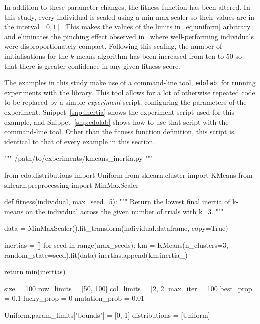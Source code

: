 In addition to these parameter changes, the fitness function has been altered.
In this study, every individual is scaled using a min-max scaler so their values
are in the interval \(\left[0, 1\right]\). This makes the values of the limits
in~\eqref{eq:uniform} arbitrary and eliminates the pinching effect observed
in~\cite{Wilde2020:edo} where well-performing individuals were
disproportionately compact. Following this scaling, the number of
initialisations for the \(k\)-means algorithm has been increased from ten to 50
so that there is greater confidence in any given fitness score.

The examples in this study make use of a command-line tool,
\href{https://github.com/daffidwilde/edolab}{\texttt{edolab}}, for
running experiments with the library. This tool allows for a lot of otherwise
repeated code to be replaced by a simple \emph{experiment} script, configuring
the parameters of the experiment. Snippet~\ref{snp:inertia} shows the experiment
script used for this example, and Snippet~\ref{snp:edolab} shows how to use that
script with the command-line tool. Other than the fitness function definition,
this script is identical to that of every example in this section.

\begin{listing}
\begin{sourcepy}
""" /path/to/experiments/kmeans_inertia.py """

from edo.distributions import Uniform
from sklearn.cluster import KMeans
from sklearn.preprocessing import MinMaxScaler


def fitness(individual, max_seed=5):
    """ Return the lowest final inertia of k-means on the individual
    across the given number of trials with k=3. """

    data = MinMaxScaler().fit_transform(individual.dataframe, copy=True)

    inertias = []
    for seed in range(max_seeds):
        km = KMeans(n_clusters=3, random_state=seed).fit(data)
        inertias.append(km.inertia_)

    return min(inertias)


size = 100
row_limits = [50, 100]
col_limits = [2, 2]
max_iter = 100
best_prop = 0.1
lucky_prop = 0
mutation_prob = 0.01

Uniform.param_limits["bounds"] = [0, 1]
distributions = [Uniform]
\end{sourcepy}
\caption{%
    An abridged version of the experiment configuration script used in the first
    example
}\label{snp:inertia}
\end{listing}

